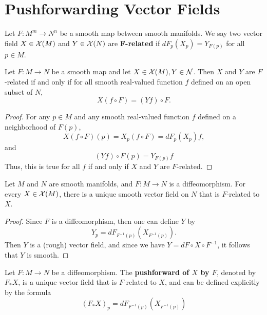 \section{Pushforwarding Vector Fields}
\begin{definition}
    Let $F: M^m \to N^n$ be a smooth map between smooth manifolds. We say two vector field $X \in \mathcal{X}(M)$ and $Y \in \mathcal{X}(N)$ are \textbf{F-related} if $dF_p(X_p) = Y_{F(p)}$ for all $p \in M$.
\end{definition}
\begin{proposition}
    Let $F: M \to N$ be a smooth map and let $X \in \mathcal{X}(M), Y \in \mathcal{N}$. Then $X$ and $Y$ are $F$-related if and only if for all smooth real-valued function $f$ defined on an open subset of $N$, 
    \[
        X(f \circ F) = (Yf)\circ F.
    \]
\end{proposition}
\begin{proof}
    For any $p \in M$ and any smooth real-valued function $f$ defined on a neighborhood of $F(p)$,
    \[
        X(f \circ F)(p) = X_p (f \circ F) = dF_p(X_p)f,
    \]
    and 
    \[
        (Y f) \circ F(p)= Y_{F(p)}f
    \]
    Thus, this is true for all $f$ if and only if $X$ and $Y$ are $F$-related.
\end{proof}
\begin{proposition}
    Let $M$ and $N$ are smooth manifolds, and $F: M \to N$ is a diffeomorphism. For every $X \in \mathcal{X}(M)$, there is a unique smooth vector field on $N$ that is $F$-related to $X$.
\end{proposition}
\begin{proof}
    Since $F$ is a diffeomorphism, then one can define $Y$ by 
    \[
        Y_p = dF_{F^{-1}(p)}(X_{F^{-1}(p)}).
    \]
    Then $Y$ is a (rough) vector field, and since we have $Y = dF \circ X \circ F^{-1}$, it follows that $Y$ is smooth.
\end{proof}
\begin{definition}
    Let $F: M \to N$ be a diffeomorphism. The \textbf{pushforward of $X$ by $F$}, denoted by $F_*X$, is a unique vector field that is $F$-related to $X$, and can be defined explicitly by the formula
    \[
    \boxed{
    (F_*X)_p = dF_{F^{-1}(p)}(X_{F^{-1}(p)})}
    \]
\end{definition}
